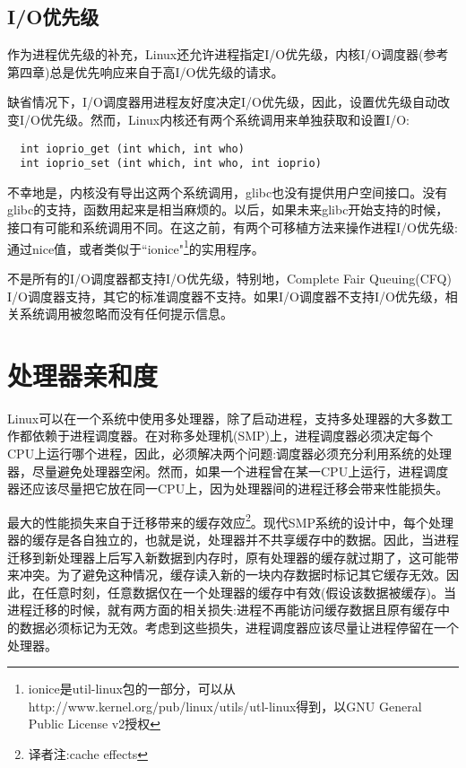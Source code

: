 \subsection{I/O优先级}

作为进程优先级的补充，Linux还允许进程指定I/O优先级，内核I/O调度器(参考第四章)总是优先响应来自于高I/O优先级的请求。

缺省情况下，I/O调度器用进程友好度决定I/O优先级，因此，设置优先级自动改变I/O优先级。然而，Linux内核还有两个系统调用来单独获取和设置I/O:

\begin{lstlisting}
  int ioprio_get (int which, int who)
  int ioprio_set (int which, int who, int ioprio)
\end{lstlisting}

不幸地是，内核没有导出这两个系统调用，glibc也没有提供用户空间接口。没有glibc的支持，函数用起来是相当麻烦的。以后，如果未来glibc开始支持的时候，接口有可能和系统调用不同。在这之前，有两个可移植方法来操作进程I/O优先级:通过nice值，或者类似于``ionice"\footnote[1]{ionice是util-linux包的一部分，可以从http://www.kernel.org/pub/linux/utils/utl-linux得到，以GNU General Public License v2授权}的实用程序。

不是所有的I/O调度器都支持I/O优先级，特别地，Complete Fair Queuing(CFQ) I/O调度器支持，其它的标准调度器不支持。如果I/O调度器不支持I/O优先级，相关系统调用被忽略而没有任何提示信息。

\section{处理器亲和度}

Linux可以在一个系统中使用多处理器，除了启动进程，支持多处理器的大多数工作都依赖于进程调度器。在对称多处理机(SMP)上，进程调度器必须决定每个CPU上运行哪个进程，因此，必须解决两个问题:调度器必须充分利用系统的处理器，尽量避免处理器空闲。然而，如果一个进程曾在某一CPU上运行，进程调度器还应该尽量把它放在同一CPU上，因为处理器间的进程迁移会带来性能损失。

最大的性能损失来自于迁移带来的缓存效应\footnote[2]{译者注:cache effects}。现代SMP系统的设计中，每个处理器的缓存是各自独立的，也就是说，处理器并不共享缓存中的数据。因此，当进程迁移到新处理器上后写入新数据到内存时，原有处理器的缓存就过期了，这可能带来冲突。为了避免这种情况，缓存读入新的一块内存数据时标记其它缓存无效。因此，在任意时刻，任意数据仅在一个处理器的缓存中有效(假设该数据被缓存)。当进程迁移的时候，就有两方面的相关损失:进程不再能访问缓存数据且原有缓存中的数据必须标记为无效。考虑到这些损失，进程调度器应该尽量让进程停留在一个处理器。

